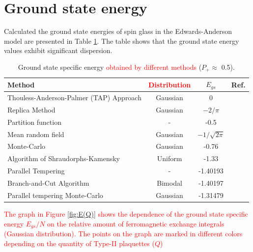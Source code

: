 \documentclass[preprint,12pt]{elsarticle}
\begin{document}
	\section{Ground state energy}
	
	Calculated the ground state energies of spin glass in the Edwards-Anderson model are presented in Table \ref{tab:Egs}. The table shows that the ground state energy values exhibit significant dispersion.
	
	\begin{table}[h]
		\begin{tabular}{|l|c|c|l|}
			\hline
			Method     &     \textcolor{red}{Distribution}                         &
			$E_{gs}$                                       &  Ref.                                          \\ \hline
			Thouless-Anderson-Palmer (TAP) Approach& Gaussian &  0                                              & \cite{thouless1977solution}    \\ \hline
			Replica Method   & Gaussian                         & $-2/\pi$                                       & \cite{sherrington1975solvable} \\ \hline
			Partition function   &   -                 & -0.5                                           & \cite{tanaka1980analytic}      \\ \hline
			Mean random field  &   Gaussian  &                   $-1/\sqrt{2\pi}$                               & \cite{klein1976comparison}     \\ \hline
			Monte-Carlo      &   Gaussian    &        -0.76                                          & \cite{kirkpatrick1978infinite} \\ \hline
			Algorithm of Shraudorphs-Kamensky   &  Uniform &     -1.33                                          & \cite{karandashev2019global}   \\ \hline
			Parallel Tempering &   -       & -1.40193                                       & \cite{palmer1999ground}        \\ \hline
			Branch-and-Cut Algorithm  & Bimodal               & -1.40197                         
			& \cite{campbell2004energy}      \\ \hline
			
			Parallel tempering Monte-Carlo    &  Gaussian         & -1.31479                                       & \cite{roma2009ground}          \\ \hline
			
			
			
		\end{tabular}
		\caption{Ground state specific energy \textcolor{red}{obtained by different methods} ($P_+\approx$ 0.5).}
		\label{tab:Egs}
	\end{table}
	\textcolor{red}{
		The graph in Figure \ref{fig:E(Q)} shows the dependence of the ground state specific energy $E_{gs}/N$ on the relative amount of ferromagnetic exchange integrals (Gaussian distribution). The points on the graph are marked in different colors depending on the quantity of Type-II plaquettes ($Q$)}
	
\end{document}
